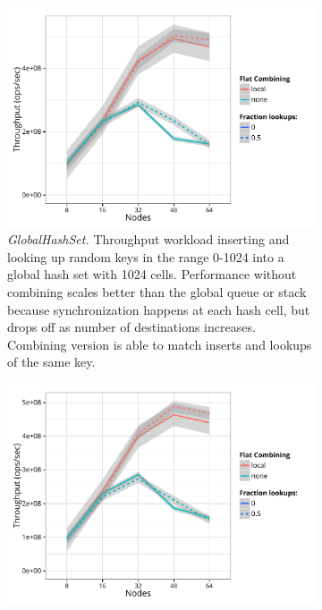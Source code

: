 \begin{figure}[t]
  \begin{subfigure}[b]{0.45\textwidth}
  \centering
  \includegraphics[width=\textwidth]{data/plots/hashset_perf.pdf}
  \caption{\emph{GlobalHashSet.} Throughput workload inserting and looking up random keys in the range 0-1024 into a global hash set with 1024 cells.
   Performance without combining scales better than the global queue or stack because synchronization happens at each hash cell, but drops off as number of destinations increases. Combining version is able to match inserts and lookups of the same key.}
  \label{fig:hashset}
  \end{subfigure}
  \hspace{0.05\textwidth}
  \begin{subfigure}[b]{0.45\textwidth}
  \centering
  \includegraphics[width=\textwidth]{data/plots/hashmap_perf.pdf}

\end{subfigure}
\end{figure}
